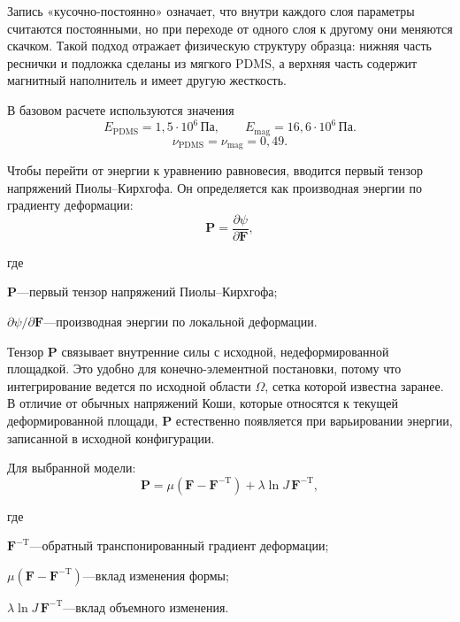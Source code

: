 \documentclass[14pt,a4paper]{extarticle}
\newif\ifwherefirst
\newcommand{\whereitem}[2]{%
    \ifwherefirst
        \wherefirstfalse
        #1\hspace{0.25em}---\hspace{0.25em}#2\par
    \else
        \noindent\hspace*{\parindent}\hphantom{где\enspace}#1\hspace{0.25em}---\hspace{0.25em}#2\par
    \fi
}
\newenvironment{whereblock}{%
    \vspace*{-1.55\baselineskip}%
    \begingroup
    \singlespacing
    \wherefirsttrue
    \par\indent где\enspace\ignorespaces
}{%
    \par\endgroup
    \par\vspace{\baselineskip}
}
\begin{document}
Запись «кусочно-постоянно» означает, что внутри каждого слоя параметры считаются постоянными, но при переходе от одного слоя к другому они меняются скачком. Такой подход отражает физическую структуру образца: нижняя часть реснички и подложка сделаны из мягкого PDMS, а верхняя часть содержит магнитный наполнитель и имеет другую жесткость.

В базовом расчете используются значения
\begin{equation}
    E_{\mathrm{PDMS}}=1,5\cdot10^{6}\,\text{Па},
    \qquad
    E_{\mathrm{mag}}=16,6\cdot10^{6}\,\text{Па}.
\end{equation}
\begin{equation}
    \nu_{\mathrm{PDMS}}=\nu_{\mathrm{mag}}=0,49.
\end{equation}

Чтобы перейти от энергии к уравнению равновесия, вводится первый тензор напряжений Пиолы--Кирхгофа. Он определяется как производная энергии по градиенту деформации:
\begin{equation}
    \mathbf{P}
    =
    \frac{\partial\psi}{\partial\mathbf{F}},
\end{equation}
\begin{whereblock}
\whereitem{\(\mathbf{P}\)}{первый тензор напряжений Пиолы--Кирхгофа;}
\whereitem{\(\partial\psi/\partial\mathbf{F}\)}{производная энергии по локальной деформации.}
\end{whereblock}

Тензор \(\mathbf{P}\) связывает внутренние силы с исходной, недеформированной площадкой. Это удобно для конечно-элементной постановки, потому что интегрирование ведется по исходной области \(\Omega\), сетка которой известна заранее. В отличие от обычных напряжений Коши, которые относятся к текущей деформированной площади, \(\mathbf{P}\) естественно появляется при варьировании энергии, записанной в исходной конфигурации.

Для выбранной модели:
\begin{equation}
    \mathbf{P}
    =
    \mu
    \left(
        \mathbf{F}-\mathbf{F}^{-\mathrm{T}}
    \right)
    +
    \lambda\ln J\,\mathbf{F}^{-\mathrm{T}},
\end{equation}
\begin{whereblock}
\whereitem{\(\mathbf{F}^{-\mathrm{T}}\)}{обратный транспонированный градиент деформации;}
\whereitem{\(\mu(\mathbf{F}-\mathbf{F}^{-\mathrm{T}})\)}{вклад изменения формы;}
\whereitem{\(\lambda\ln J\,\mathbf{F}^{-\mathrm{T}}\)}{вклад объемного изменения.}
\end{whereblock}
\end{document}
